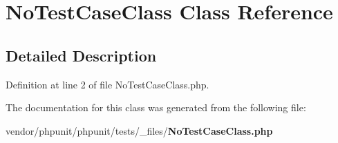 \section{No\+Test\+Case\+Class Class Reference}
\label{class_no_test_case_class}


\subsection{Detailed Description}


Definition at line 2 of file No\+Test\+Case\+Class.\+php.



The documentation for this class was generated from the following file\+:\begin{DoxyCompactItemize}
\item 
vendor/phpunit/phpunit/tests/\+\_\+files/{\bf No\+Test\+Case\+Class.\+php}\end{DoxyCompactItemize}
